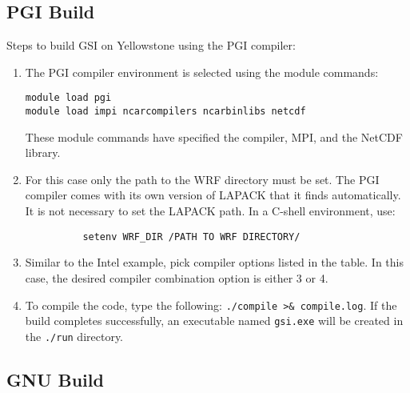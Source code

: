 \subsection{PGI Build}

Steps to build GSI on Yellowstone using the PGI compiler:
\begin{enumerate}
\item The PGI compiler environment is selected using the module commands:
\begin{verbatim}
module load pgi
module load impi ncarcompilers ncarbinlibs netcdf
\end{verbatim}
These module commands have specified the compiler, MPI, and the NetCDF library.
\item For this case only the path to the WRF directory must be set. The PGI compiler comes with its own version of LAPACK that it finds automatically. It is not necessary to set the LAPACK path. In a C-shell environment, use:
\begin{verbatim}
          setenv WRF_DIR /PATH TO WRF DIRECTORY/
\end{verbatim}
\item Similar to the Intel example, pick compiler options listed in the table. In this case, the desired compiler combination option is either 3 or 4.
\item To compile the code, type the following: \verb|./compile >& compile.log|. If the build completes successfully, an executable named \verb|gsi.exe| will be created in the \verb|./run| directory.
\end{enumerate}

\subsection{GNU Build}

